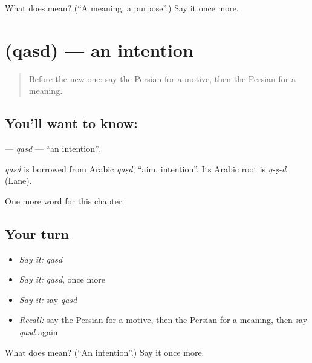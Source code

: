 \begin{tcolorbox}[breakable,colback=teal!4,colframe=teal!35!black,title={Before you move on}]
What does  mean? (\textquotedblleft{}A meaning, a purpose\textquotedblright{}.) Say it once more.
\end{tcolorbox}
\section[\texorpdfstring{\fa{قصد} (qasd)}{قصد (qasd)}]{ (qasd) — an intention}

\label{lesson:FA-C160-qasd}



\begin{quote}
Before the new one: say the Persian for a motive, then the Persian for a meaning.
\end{quote}

\subsection*{You'll want to know: }
\textbf{} — \emph{qasd} — \textquotedblleft{}an intention\textquotedblright{}.

\begin{cousinweb}
\emph{qasd} is borrowed from Arabic \emph{qaṣd}, \textquotedblleft{}aim, intention\textquotedblright{}. Its Arabic root is \emph{q-ṣ-d} (Lane).
\end{cousinweb}

\begin{grammarlens}[title={What you've built}]
One more word for this chapter.
\end{grammarlens}

\subsection*{Your turn}
\begin{itemize}
\raggedright
  \item \emph{Say it:} \emph{qasd}
  \item \emph{Say it:} \emph{qasd}, once more
  \item \emph{Say it:} say \emph{qasd}
  \item \emph{Recall:} say the Persian for a motive, then the Persian for a meaning, then say \emph{qasd} again
\end{itemize}

\begin{tcolorbox}[breakable,colback=teal!4,colframe=teal!35!black,title={Before you move on}]
What does  mean? (\textquotedblleft{}An intention\textquotedblright{}.) Say it once more.
\end{tcolorbox}
